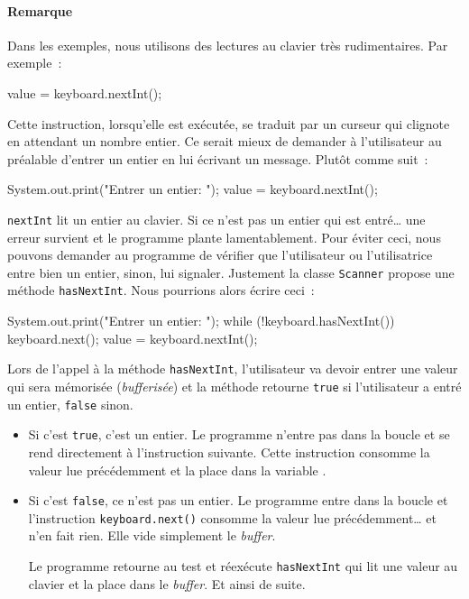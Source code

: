 		\paragraph{Remarque}

		Dans les exemples, nous utilisons des lectures au clavier très
		rudimentaires. Par exemple~:

		\begin{java}
value = keyboard.nextInt();			
		\end{java}

		Cette instruction, lorsqu'elle est exécutée, se traduit par un curseur
		qui clignote en attendant un nombre entier. Ce serait mieux de
		demander à l'utilisateur au préalable d'entrer un entier en lui écrivant
		un message. Plutôt comme suit~:

		\begin{java}
System.out.print("Entrer un entier: ");			
value = keyboard.nextInt();			
		\end{java}

		\texttt{nextInt} lit un entier au clavier. Si ce n'est pas un entier qui
		est entré… une erreur survient et le programme plante lamentablement.
		Pour éviter ceci, nous pouvons demander au programme de vérifier que
		l'utilisateur ou l'utilisatrice entre bien un entier, sinon, lui
		signaler. Justement la classe \texttt{Scanner} propose une méthode
		\texttt{hasNextInt}. Nous pourrions alors écrire ceci~:

		\begin{java}
System.out.print("Entrer un entier: ");			
while (!keyboard.hasNextInt()){
	keyboard.next();
}
value = keyboard.nextInt();						
		\end{java}

		Lors de l'appel à la méthode \texttt{hasNextInt}, l'utilisateur va
		devoir entrer une valeur qui sera mémorisée (\textit{bufferisée}) et la
		méthode retourne \texttt{true} si l'utilisateur a entré un entier,
		\texttt{false} sinon. 
		\begin{itemize}

			\item Si c'est \texttt{true}, c'est un entier. Le programme n'entre
				pas dans la boucle et se rend directement à l'instruction
				suivante. Cette instruction consomme la valeur lue précédemment
				et la place dans la variable .

			\item Si c'est \texttt{false}, ce n'est pas un entier. Le programme
				entre dans la boucle et l'instruction \texttt{keyboard.next()}
				consomme la valeur lue précédemment… et n'en fait rien. Elle
				vide simplement le \textit{buffer}. 

				Le programme retourne au test et réexécute \texttt{hasNextInt}
				qui lit une valeur au clavier et la place dans le
				\textit{buffer}. Et ainsi de suite. 

		\end{itemize}
			
